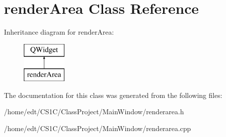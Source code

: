 \hypertarget{classrenderArea}{\section{render\-Area Class Reference}
\label{classrenderArea}
}
Inheritance diagram for render\-Area\-:\begin{figure}[H]
\begin{center}
\leavevmode
\includegraphics[height=2.000000cm]{classrenderArea}
\end{center}
\end{figure}


The documentation for this class was generated from the following files\-:\begin{DoxyCompactItemize}
\item 
/home/edt/\-C\-S1\-C/\-Class\-Project/\-Main\-Window/renderarea.\-h\item 
/home/edt/\-C\-S1\-C/\-Class\-Project/\-Main\-Window/renderarea.\-cpp\end{DoxyCompactItemize}
